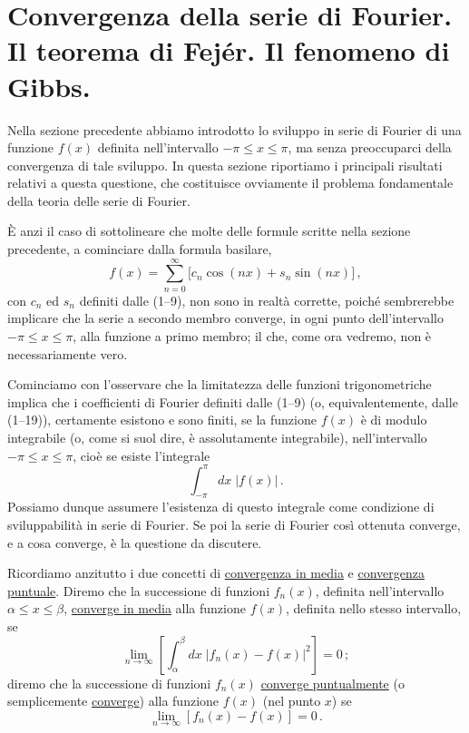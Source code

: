 \documentclass[11pt, a4paper]{book}
\numberwithin{equation}{section}
\begin{document}
\section{Convergenza della serie di Fourier. Il teorema di Fejér. Il fenomeno di Gibbs.}

Nella sezione precedente abbiamo introdotto lo sviluppo in serie di Fourier di una funzione $f(x)$ definita nell'intervallo $-\pi \leq x \leq \pi$, ma senza preoccuparci della convergenza di tale sviluppo. In questa sezione riportiamo i principali risultati relativi a questa questione, che costituisce ovviamente il problema fondamentale della teoria delle serie di Fourier.

È anzi il caso di sottolineare che molte delle formule scritte nella sezione precedente, a cominciare dalla formula basilare,
\begin{equation}
  f(x) = \sum_{n=0}^{\infty}\bigl[c_n\cos(nx) + s_n\sin(nx)\bigr]\,, \tag{1}
\end{equation}
con $c_n$ ed $s_n$ definiti dalle (1--9), non sono in realtà corrette, poiché sembrerebbe implicare che la serie a secondo membro converge, in ogni punto dell'intervallo $-\pi \leq x \leq \pi$, alla funzione a primo membro; il che, come ora vedremo, non è necessariamente vero.

Cominciamo con l'osservare che la limitatezza delle funzioni trigonometriche implica che i coefficienti di Fourier definiti dalle (1--9) (o, equivalentemente, dalle (1--19)), certamente esistono e sono finiti, se la funzione $f(x)$ è di modulo integrabile (o, come si suol dire, è assolutamente integrabile), nell'intervallo $-\pi \leq x \leq \pi$, cioè se esiste l'integrale
\[
  \int_{-\pi}^{\pi} dx\;|f(x)|\,.
\]
Possiamo dunque assumere l'esistenza di questo integrale come condizione di sviluppabilità in serie di Fourier. Se poi la serie di Fourier così ottenuta converge, e a cosa converge, è la questione da discutere.

Ricordiamo anzitutto i due concetti di \underline{convergenza in media} e \underline{convergenza puntuale}. Diremo che la successione di funzioni $f_n(x)$, definita nell'intervallo $\alpha \leq x \leq \beta$, \underline{converge in media} alla funzione $f(x)$, definita nello stesso intervallo, se
\begin{equation}
  \lim_{n\to\infty}\left[\int_\alpha^\beta dx\;|f_n(x)-f(x)|^2\right] = 0\,; \tag{2}
\end{equation}
diremo che la successione di funzioni $f_n(x)$ \underline{converge puntualmente} (o semplicemente \underline{converge}) alla funzione $f(x)$ (nel punto $x$) se
\begin{equation}
  \lim_{n\to\infty}\left[f_n(x)-f(x)\right] = 0\,. \tag{3}
\end{equation}
\end{document}
